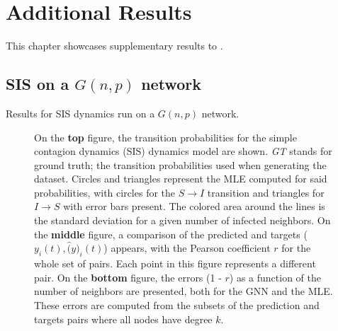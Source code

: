 \chapter{Additional Results}\label{sec:res_add}

This chapter showcases supplementary results to .

\section{SIS on a $G(n, p)$ network}\label{sec:res_gnp}

Results for SIS dynamics run on a $G(n, p)$ network.


\begin{figure}[H]
  \centering
  \caption[Results for $G(n,p)$ network running SIS dynamics]{
    On the \textbf{top }figure, the transition probabilities for the simple
    contagion dynamics (SIS) dynamics model are shown. \textit{GT} stands
    for ground truth; the transition probabilities used when generating
    the dataset. Circles and triangles represent the MLE computed for said
    probabilities, with circles for the $S \rightarrow I$ transition and
    triangles for $I \rightarrow S$ with error bars present. The colored
    area around the lines is the standard deviation for a given number of
    infected neighbors. On the \textbf{middle} figure, a comparison of
    the predicted and targets ($y_i(t), \hat(y)_i(t)$) appears, with the Pearson
    coefficient $r$ for the whole set of pairs. Each point in this figure represents
    a different pair. On the \textbf{bottom} figure, the errors (1 - $r$) as a function
    of the number of neighbors are presented, both for the GNN and the MLE. These errors
    are computed from the subsets of the prediction and targets pairs where all
    nodes have degree $k$.
  }
  \label{fig:gnp_sis}
\end{figure}